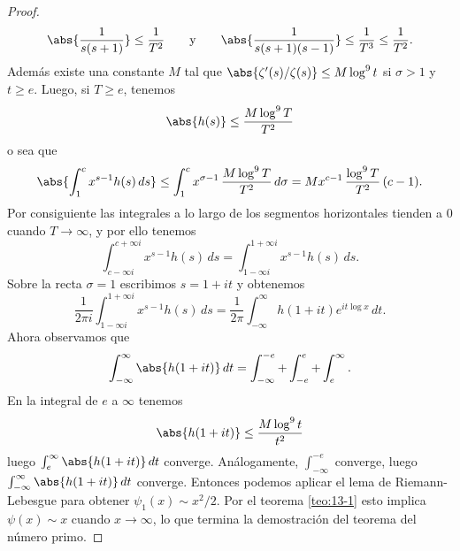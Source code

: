 \documentclass[12pt,a4paper]{book}
\begin{document}
\begin{proof}
        \begin{equation*}
            \abs{\frac{1}{s(s+1)}}\leq\frac{1}{T^{2}}\qquad\text{y}\qquad\abs{\frac{1}{s(s+1)(s-1)}}\leq\frac{1}{T^{3}}\leq\frac{1}{T^{2}}.
        \end{equation*}
        Además existe una constante $M$ tal que $\abs{\zeta'(s)/\zeta(s)}\leq M\log^{9}t$ si
        $\sigma>1$ y $t\geq e$. Luego, si $T\geq e$, tenemos
        \begin{equation*}
            \abs{h(s)}\leq\frac{M\log^{9}T}{T^{2}}
        \end{equation*}
        o sea que
        \begin{equation*}
            \abs{\int_{1}^{c}x^{s-1}h(s)\,ds}\leq\int_{1}^{c}x^{\sigma-1}\,\frac{M\log^{9}T}{T^{2}}\,d\sigma=Mx^{c-1}\,\frac{\log^{9}T}{T^{2}}\,(c-1).
        \end{equation*}
        Por consiguiente las integrales a lo largo de los segmentos horizontales tienden a 0
        cuando $T\to\infty$, y por ello tenemos
        \begin{equation*}
            \int_{c-\infty i}^{c+\infty i}x^{s-1}h(s)\,ds=\int_{1-\infty i}^{1+\infty i}x^{s-1}h(s)\,ds.
        \end{equation*}
        Sobre la recta $\sigma=1$ escribimos $s=1+it$ y obtenemos
        \begin{equation*}
            \frac{1}{2\pi i}\int_{1-\infty i}^{1+\infty i}x^{s-1}h(s)\,ds=\frac{1}{2\pi}\int_{-\infty}^{\infty}h(1+it)e^{it\log x}\,dt.
        \end{equation*}
        Ahora observamos que
        \begin{equation*}
            \int_{-\infty}^{\infty}\abs{h(1+it)}\,dt=\int_{-\infty}^{-e}+\int_{-e}^{e}+\int_{e}^{\infty}.
        \end{equation*}
        En la integral de $e$ a $\infty$ tenemos
        \begin{equation*}
            \abs{h(1+it)}\leq\frac{M\log^{9}t}{t^{2}}
        \end{equation*}
        luego $\int_{e}^{\infty}\abs{h(1+it)}\,dt$ converge. Análogamente, $\int_{-\infty}^{-e}$
        converge, luego $\int_{-\infty}^{\infty}\abs{h(1+it)}\,dt$ converge. Entonces podemos
        aplicar el lema de Riemann-Lebesgue para obtener $\psi_{1}(x)\sim x^{2}/2$. Por el teorema
        \ref{teo:13-1} esto implica $\psi(x)\sim x$ cuando $x\to\infty$, lo que termina la
        demostración del teorema del número primo.
    \end{proof}
\end{document}
